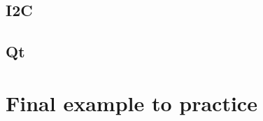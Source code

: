 \documentclass{article}
\begin{document}
\subsection{I2C}

\subsection{Qt}

\section{Final example to practice} \label{sec:final-example}




\end{document}
